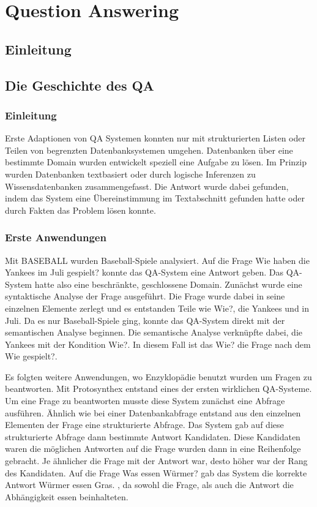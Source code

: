 \documentclass[
        ngerman,
        paper=a4,
        numbers=noendperiod,
]{scrreprt}
\begin{document}
\chapter{Question Answering}

\section{Einleitung} %
\section{Die Geschichte des QA} %
\subsection{Einleitung}
Erste Adaptionen von QA Systemen konnten nur mit strukturierten Listen oder Teilen von begrenzten Datenbanksystemen umgehen. Datenbanken über eine bestimmte Domain wurden entwickelt speziell eine Aufgabe zu lösen. Im Prinzip wurden Datenbanken textbasiert oder durch logische Inferenzen zu Wissensdatenbanken zusammengefasst. Die Antwort wurde dabei gefunden, indem das System eine Übereinstimmung im Textabschnitt gefunden hatte oder durch Fakten das Problem lösen konnte.
\subsection{Erste Anwendungen}
Mit \glqq BASEBALL\grqq{}  \citep{Green1961Baseball:Question-answerer} wurden Baseball-Spiele analysiert.  Auf die Frage \glqq Wie haben die Yankees im Juli gespielt?\grqq{} konnte das QA-System eine Antwort geben. Das QA-System hatte also eine beschränkte, geschlossene Domain. Zunächst wurde eine syntaktische Analyse der Frage ausgeführt. Die Frage wurde dabei in seine einzelnen Elemente zerlegt und es entstanden Teile wie \glqq Wie?\grqq{}, \glqq die Yankees\grqq{} und \glqq in Juli\grqq{}. Da es nur Baseball-Spiele ging, konnte das QA-System direkt mit der semantischen Analyse beginnen. Die semantische Analyse verknüpfte dabei, \glqq die Yankees\grqq{} mit der Kondition \glqq Wie?\grqq{}. In diesem Fall ist das \glqq Wie?\grqq{} die Frage nach dem \glqq Wie gespielt?\grqq{}.

Es folgten weitere Anwendungen, wo Enzyklopädie benutzt wurden um Fragen zu beantworten. Mit \glqq Protosynthex\grqq{} \citep{Simmons1964IndexingQuestions} entstand eines der ersten wirklichen QA-Systeme. Um eine Frage zu beantworten musste diese System zunächst eine Abfrage ausführen. Ähnlich wie bei einer Datenbankabfrage entstand aus den einzelnen Elementen der Frage eine strukturierte Abfrage. Das System gab auf diese strukturierte Abfrage dann bestimmte Antwort Kandidaten. Diese Kandidaten waren die möglichen Antworten auf die Frage wurden dann in eine Reihenfolge gebracht. Je ähnlicher die Frage mit der Antwort war, desto höher war der Rang des Kandidaten. Auf die Frage \glqq Was essen Würmer?\grqq{} gab das System die korrekte Antwort \glqq Würmer essen Gras.\grqq{} , da sowohl die Frage, als auch die Antwort die Abhängigkeit \glqq essen\grqq{} beinhalteten. 
\end{document}

